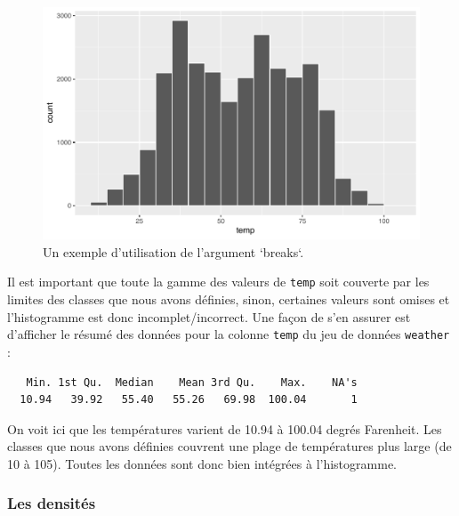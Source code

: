 \documentclass[
  a4paper,
]{article}
\newenvironment{Shaded}{\begin{snugshade}}{\end{snugshade}}
\newcommand{\KeywordTok}[1]{\textcolor[rgb]{0.12,0.11,0.11}{\textbf{#1}}}
\newcommand{\NormalTok}[1]{\textcolor[rgb]{0.12,0.11,0.11}{#1}}
\newcommand{\OperatorTok}[1]{\textcolor[rgb]{0.12,0.11,0.11}{#1}}
\begin{document}
\begin{figure}[htpb]

{\centering \includegraphics[width=0.9\linewidth]{figure/break-1} 

}

\caption{Un exemple d'utilisation de l'argument `breaks`.}\label{fig:break}
\end{figure}

Il est important que toute la gamme des valeurs de \texttt{temp} soit couverte par les limites des classes que nous avons définies, sinon, certaines valeurs sont omises et l'histogramme est donc incomplet/incorrect. Une façon de s'en assurer est d'afficher le résumé des données pour la colonne \texttt{temp} du jeu de données \texttt{weather} :

\begin{Shaded}
\end{Shaded}

\begin{verbatim}
   Min. 1st Qu.  Median    Mean 3rd Qu.    Max.    NA's 
  10.94   39.92   55.40   55.26   69.98  100.04       1 
\end{verbatim}

On voit ici que les températures varient de 10.94 à 100.04 degrés Farenheit. Les classes que nous avons définies couvrent une plage de températures plus large (de 10 à 105). Toutes les données sont donc bien intégrées à l'histogramme.

\hypertarget{les-densituxe9s}{%
\subsubsection{Les densités}\label{les-densituxe9s}}
\end{document}
